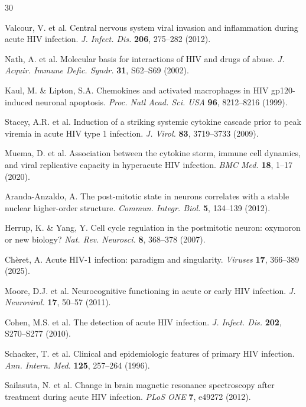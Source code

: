 \documentclass[10pt,a4paper]{article}
\begin{document}
\begin{thebibliography}{30}

Valcour, V. et al. Central nervous system viral invasion and inflammation during acute HIV infection. \textit{J. Infect. Dis.} \textbf{206}, 275--282 (2012).

Nath, A. et al. Molecular basis for interactions of HIV and drugs of abuse. \textit{J. Acquir. Immune Defic. Syndr.} \textbf{31}, S62--S69 (2002).

Kaul, M. \& Lipton, S.A. Chemokines and activated macrophages in HIV gp120-induced neuronal apoptosis. \textit{Proc. Natl Acad. Sci. USA} \textbf{96}, 8212--8216 (1999).

Stacey, A.R. et al. Induction of a striking systemic cytokine cascade prior to peak viremia in acute HIV type 1 infection. \textit{J. Virol.} \textbf{83}, 3719--3733 (2009).

Muema, D. et al. Association between the cytokine storm, immune cell dynamics, and viral replicative capacity in hyperacute HIV infection. \textit{BMC Med.} \textbf{18}, 1--17 (2020).

Aranda-Anzaldo, A. The post-mitotic state in neurons correlates with a stable nuclear higher-order structure. \textit{Commun. Integr. Biol.} \textbf{5}, 134--139 (2012).

Herrup, K. \& Yang, Y. Cell cycle regulation in the postmitotic neuron: oxymoron or new biology? \textit{Nat. Rev. Neurosci.} \textbf{8}, 368--378 (2007).

Ch\`{e}ret, A. Acute HIV-1 infection: paradigm and singularity. \textit{Viruses} \textbf{17}, 366--389 (2025).

Moore, D.J. et al. Neurocognitive functioning in acute or early HIV infection. \textit{J. Neurovirol.} \textbf{17}, 50--57 (2011).

Cohen, M.S. et al. The detection of acute HIV infection. \textit{J. Infect. Dis.} \textbf{202}, S270--S277 (2010).

Schacker, T. et al. Clinical and epidemiologic features of primary HIV infection. \textit{Ann. Intern. Med.} \textbf{125}, 257--264 (1996).

Sailasuta, N. et al. Change in brain magnetic resonance spectroscopy after treatment during acute HIV infection. \textit{PLoS ONE} \textbf{7}, e49272 (2012).


\end{thebibliography}
\end{document}
